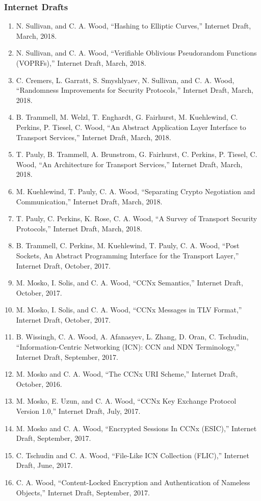 \documentclass[10pt]{res}
\begin{document}
\begin{resume}
\subsubsection*{Internet Drafts}
\begin{enumerate}[D-1.]
    \item N. Sullivan, and C. A. Wood, ``Hashing to Elliptic Curves,'' Internet Draft, March, 2018. 
    \item N. Sullivan, and C. A. Wood, ``Verifiable Oblivious Pseudorandom Functions (VOPRFs),'' Internet Draft, March, 2018.
    \item C. Cremers, L. Garratt, S. Smyshlyaev, N. Sullivan, and C. A. Wood, ``Randomness Improvements for Security Protocols,'' Internet Draft, March, 2018.
    \item B. Trammell, M. Welzl, T. Enghardt, G. Fairhurst, M. Kuehlewind, C. Perkins, P. Tiesel, C. Wood, ``An Abstract Application Layer Interface to Transport Services,'' Internet Draft, March, 2018.
    \item T. Pauly, B. Trammell, A. Brunstrom, G. Fairhurst, C. Perkins, P. Tiesel, C. Wood, ``An Architecture for Transport Services,'' Internet Draft, March, 2018.
    \item M. Kuehlewind, T. Pauly, C. A. Wood, ``Separating Crypto Negotiation and Communication,'' Internet Draft, March, 2018. 
    \item T. Pauly, C. Perkins, K. Rose, C. A. Wood, ``A Survey of Transport Security Protocols,'' Internet Draft, March, 2018.
    \item B. Trammell, C. Perkins, M. Kuehlewind, T. Pauly, C. A. Wood, ``Post Sockets, An Abstract Programming Interface for the Transport Layer,'' Internet Draft, October, 2017.
    \item M. Mosko, I. Solis, and C. A. Wood, ``CCNx Semantics,'' Internet Draft, October, 2017. 
    \item M. Mosko, I. Solis, and C. A. Wood, ``CCNx Messages in TLV Format,'' Internet Draft, October, 2017.
    \item B. Wissingh, C. A. Wood, A. Afanasyev, L. Zhang, D. Oran, C. Tschudin, ``Information-Centric Networking (ICN): CCN and NDN Terminology,'' Internet Draft, September, 2017.
    \item M. Mosko and C. A. Wood, ``The CCNx URI Scheme,'' Internet Draft, October, 2016. 
    \item M. Mosko, E. Uzun, and C. A. Wood, ``CCNx Key Exchange Protocol Version 1.0,'' Internet Draft, July, 2017. 
    \item M. Mosko and C. A. Wood, ``Encrypted Sessions In CCNx (ESIC),'' Internet Draft, September, 2017. 
    \item C. Tschudin and C. A. Wood, ``File-Like ICN Collection (FLIC),'' Internet Draft, June, 2017.
    \item C. A. Wood, ``Content-Locked Encryption and Authentication of Nameless Objects,'' Internet Draft, September, 2017.
\end{enumerate}


\end{resume}
\end{document}
